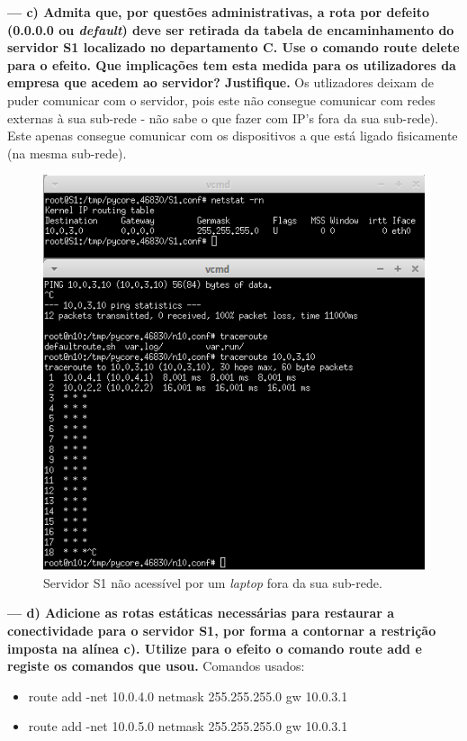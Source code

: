 \documentclass[a4paper]{article}
\begin{document}
\textbf{--- c) Admita que, por questões administrativas, a rota por defeito (0.0.0.0 ou \textit{default}) deve ser retirada da tabela de encaminhamento do servidor S1 localizado no departamento C. Use o comando \textbf{route delete} para o efeito. Que implicações tem esta medida para os utilizadores da empresa que acedem ao servidor? Justifique.}\newline
Os utlizadores deixam de puder comunicar com o servidor, pois este não consegue comunicar com redes externas à sua sub-rede - não sabe o que fazer com IP's fora da sua sub-rede). Este apenas consegue comunicar com os dispositivos a que está ligado fisicamente (na mesma sub-rede).
\begin{figure}[h]
    \centering
    \includegraphics[scale=1]{parte2/notconnected.PNG}\newline
    \caption{Servidor S1 não acessível por um \textit{laptop} fora da sua sub-rede.}
    \label{fig:my_label}
\end{figure}

\vspace{1cm}

\textbf{--- d) Adicione as rotas estáticas necessárias para restaurar a conectividade para o servidor S1, por forma a contornar a restrição imposta na alínea c). Utilize para o efeito o comando \textbf{route add} e registe os comandos que usou.}\newline
Comandos usados:
\begin{itemize}
    \item route add -net 10.0.4.0 netmask 255.255.255.0 gw 10.0.3.1
    \item route add -net 10.0.5.0 netmask 255.255.255.0 gw 10.0.3.1
\end{itemize}
\end{document}
